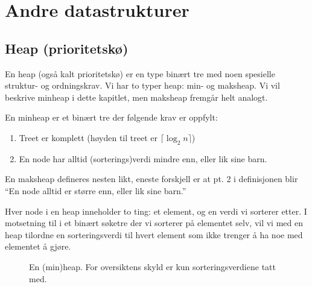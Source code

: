 \section{Andre datastrukturer}
\subsection{Heap (prioritetskø)}\label{heap}
En heap (også kalt prioritetskø) er en type binært tre med noen spesielle struktur- og ordningskrav. Vi har to typer heap: min- og maksheap. Vi vil beskrive minheap i dette kapitlet, men maksheap fremgår helt analogt.

\begin{definition} En minheap er et binært tre der følgende krav er oppfylt:  \label{def:heap}
\begin{enumerate}
\item Treet er komplett (høyden til treet er $ \lceil\log_2 n\rceil $)
\item En node har alltid (sorterings)verdi mindre enn, eller lik sine barn. 
\end{enumerate}
\end{definition}

En maksheap defineres nesten likt, eneste forskjell er at pt. 2 i definisjonen blir ``En node alltid er større enn, eller lik sine barn.''

Hver node i en heap inneholder to ting: et element, og en verdi vi sorterer etter. I motsetning til i et binært søketre der vi sorterer på elementet selv, vil vi med en heap tilordne en sorteringsverdi til hvert element som ikke trenger å ha noe med elementet å gjøre. 


\begin{figure}[H]
\centering
\caption{En (min)heap. For oversiktens skyld er kun sorteringsverdiene tatt med.}
\label{fig:heap}
\end{figure}

